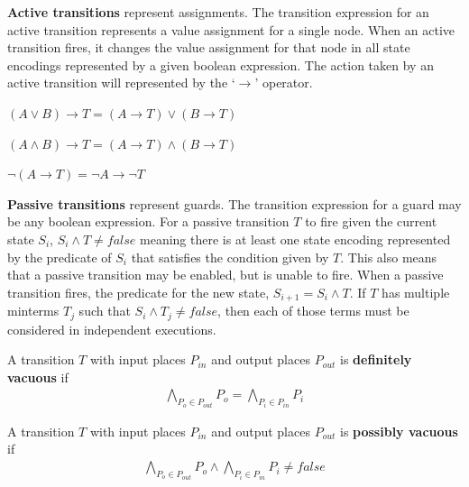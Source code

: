 \begin{definition}
\textbf{Active transitions} represent assignments. The transition expression for an active transition represents a value assignment for a single node. When an active transition fires, it changes the value assignment for that node in all state encodings represented by a given boolean expression. The action taken by an active transition will represented by the `$\rightarrow$' operator.
\end{definition}

\begin{lemma}
$(A \vee B) \rightarrow T = (A \rightarrow T) \vee (B \rightarrow T)$
\end{lemma}

\begin{lemma}
$(A \wedge B) \rightarrow T = (A \rightarrow T) \wedge (B \rightarrow T)$
\end{lemma}

\begin{lemma}
$\neg (A \rightarrow T) = \neg A \rightarrow \neg T$
\end{lemma}

\begin{definition}
\textbf{Passive transitions} represent guards. The transition expression for a guard may be any boolean expression. For a passive transition $T$ to fire given the current state $S_i$, $S_i \wedge T \ne false$ meaning there is at least one state encoding represented by the predicate of $S_i$ that satisfies the condition given by $T$. This also means that a passive transition may be enabled, but is unable to fire. When a passive transition fires, the predicate for the new state, $S_{i+1} = S_i \wedge T$. If $T$ has multiple minterms $T_j$ such that $S_i \wedge T_j \ne false$, then each of those terms must be considered in independent executions.
\end{definition}

\begin{definition}
A transition $T$ with input places $P_{in}$ and output places $P_{out}$ is \textbf{definitely vacuous} if
\begin{align}
 \bigwedge_{P_o \in P_{out}} P_o = \bigwedge_{P_i \in P_{in}} P_i
\end{align}
\end{definition}

\begin{definition}
A transition $T$ with input places $P_{in}$ and output places $P_{out}$ is \textbf{possibly vacuous} if
\begin{align}
 \bigwedge_{P_o \in P_{out}} P_o \wedge \bigwedge_{P_i \in P_{in}} P_i \ne false
\end{align}
\end{definition}

